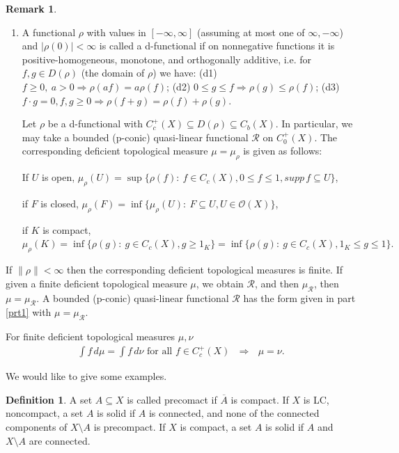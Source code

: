\documentclass[sn-mathphys-num]{sn-jnl}%
\theoremstyle{thmstyleone}%
\theoremstyle{definition}
\newtheorem{definition}[theorem]{Definition}
\newtheorem{remark}[theorem]{Remark}
\begin{document}
\begin{remark}
\begin{enumerate} [leftmargin=0.2in, label=(\Roman*),ref=(\Roman*)]
\item \label{mrDTM} 
A functional $\rho$ with values in $[ -\infty, \infty]$ (assuming at most one of $\infty, - \infty$) and $| \rho(0) | < \infty$ 
is called a d-functional if   
on nonnegative functions it is positive-homogeneous, monotone, and orthogonally additive, i.e. for $f, g \in D(\rho)$ (the domain of $ \rho$) we have: 
(d1) $f \ge 0, \ a > 0  \Longrightarrow  \rho (a f) = a \rho(f)$; 
(d2) $0 \le  g \le f \Longrightarrow  \rho(g) \le \rho(f) $;
(d3) $f \cdot g = 0, f,g \ge 0  \Longrightarrow  \rho(f + g) = \rho(f) + \rho(g)$. 

Let  $\rho$ be a d-functional with $  C_c^+(X) \subseteq D(\rho) \subseteq C_b(X)$. 
In particular, we may take a bounded (p-conic) quasi-linear functional $ \mathcal{R}$ on $  C_0^+(X)$. 
The corresponding
deficient topological measure $ \mu = \mu_{\rho}$ is given as follows: 

If $U$ is open, $ \mu_{\rho}(U) = \sup\{ \rho(f): \  f \in C_c(X), 0\le f \le 1,  supp \, f\subseteq U  \}$,

if $F$ is closed, $ \mu_{\rho}(F) = \inf \{ \mu_{\rho}(U): \  F \subseteq U,  U \in \mathscr{O}(X) \}$, 

if $K$ is compact, $ \mu_{\rho}(K) = \inf \{ \rho(g): \   g \in C_c(X), g \ge 1_K \}  
= \inf \{ \rho(g): \   g \in C_c(X), 1_K \le g \le 1 \}. $
\end{enumerate}
If $\| \rho\| < \infty$ then the corresponding deficient topological measures is finite.  
If given a finite deficient topological measure $\mu$, we obtain $ \mathcal R$, and then $\mu_{ \mathcal R}$, then $ \mu = \mu_{ \mathcal R}$.
A bounded (p-conic) quasi-linear functional $ \mathcal{R}$  has the form given in part \ref{prt1} with $ \mu = \mu_{\mathcal{R}}$. 

For finite deficient topological measures $ \mu, \nu$
\begin{align} \label{EqByInt}
\int f \, d\mu = \int f \, d\nu  \mbox{    for all    }   f \in C_c^+(X)  \ \ \  \Longrightarrow \ \ \  \mu = \nu.
\end{align}
\end{remark}

We would like to give some examples. 

\begin{definition}
A set $A \subseteq X$ is called precomact if $\overline A$ is compact. 
If $X$ is LC, noncompact, a set $A$ is solid if $A$ is  connected, and none of the connected components of  $X \setminus A$ is precompact. 
If $X$ is compact, a set $A$ is solid if $A$ and $X \setminus A$ are connected.
\end{definition}
\end{document}
